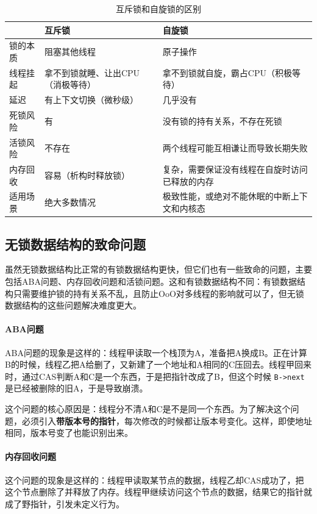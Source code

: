 \begin{table}
    \centering
    \begin{tabular}{l|p{6cm}p{6cm}}
        \toprule
        & 互斥锁 & 自旋锁 \\
        \midrule
        锁的本质 & 阻塞其他线程 & 原子操作 \\
        线程挂起 & 拿不到锁就睡、让出CPU（消极等待） & 拿不到锁就自旋，霸占CPU（积极等待）\\
        延迟 & 有上下文切换（微秒级） & 几乎没有 \\
        死锁风险 & 有 & 没有锁的持有关系，不存在死锁 \\
        活锁风险 & 不存在 & 两个线程可能互相谦让而导致长期失败 \\
        内存回收 & 容易（析构时释放锁） & 复杂，需要保证没有线程在自旋时访问已释放的内存 \\
        适用场景 & 绝大多数情况 & 极致性能，或绝对不能休眠的中断上下文和内核态 \\
        \bottomrule
    \end{tabular}
    \caption{互斥锁和自旋锁的区别}
    \label{tab:lock}
\end{table}

\subsection{无锁数据结构的致命问题} 

虽然无锁数据结构比正常的有锁数据结构更快，但它们也有一些致命的问题，主要包括ABA问题、内存回收问题和活锁问题。这和有锁数据结构不同：有锁数据结构只需要维护锁的持有关系不乱，且防止OoO对多线程的影响就可以了，但无锁数据结构的这些问题解决难度更大。

\paragraph{ABA问题} ABA问题的现象是这样的：线程甲读取一个栈顶为A，准备把A换成B。正在计算B的时候，线程乙把A给删了，又新建了一个地址和A相同的C压回去。线程甲回来时，通过CAS判断A和C是一个东西，于是把指针改成了B，但这个时候 \verb|B->next| 是已经被删除的旧A，于是导致崩溃。

这个问题的核心原因是：线程分不清A和C是不是同一个东西。为了解决这个问题，必须引入\textbf{带版本号的指针}，每次修改的时候都让版本号变化。这样，即使地址相同，版本号变了也能识别出来。

\paragraph{内存回收问题} 这个问题的现象是这样的：线程甲读取某节点的数据，线程乙却CAS成功了，把这个节点删除了并释放了内存。线程甲继续访问这个节点的数据，结果它的指针就成了野指针，引发未定义行为。

